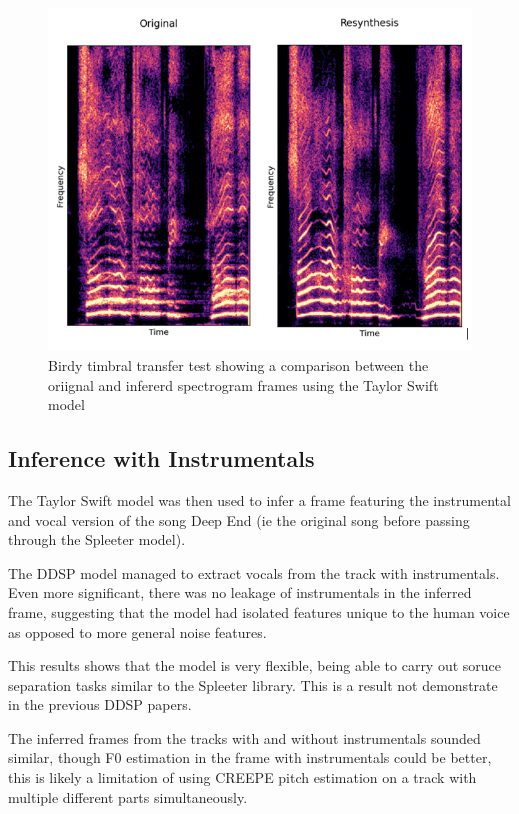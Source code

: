 \begin{figure}[H]
    \centering
    \includegraphics[width=\textwidth]{research/results/Birdy/TimbralTransfer.png}
    \caption{Birdy timbral transfer test showing a comparison between the oriignal and infererd spectrogram frames using the Taylor Swift model}
\end{figure}

\subsection{Inference with Instrumentals}

The Taylor Swift model was then used to infer a frame featuring the instrumental and vocal version of the song Deep End (ie the original song before passing through the Spleeter model).

The DDSP model managed to extract vocals from the track with instrumentals. Even more significant, there was no leakage of instrumentals in the inferred frame, suggesting that the model had isolated features unique to the human voice as opposed to more general noise features.

This results shows that the model is very flexible, being able to carry out soruce separation tasks similar to the Spleeter library\cite{Spleeter}. This is a result not demonstrate in the previous DDSP papers.

The inferred frames from the tracks with and without instrumentals sounded similar, though F0 estimation in the frame with instrumentals could be better, this is likely a limitation of using CREEPE pitch estimation on a track with multiple different parts simultaneously.

